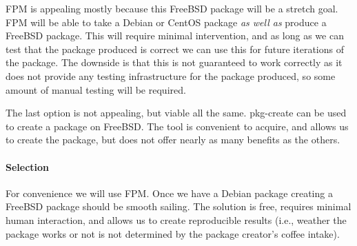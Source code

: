 FPM is appealing mostly because this FreeBSD package will be a stretch goal.
FPM will be able to take a Debian or CentOS package \textit{as well as} produce a FreeBSD package.
This will require minimal intervention, and as long as we can test that the package produced is correct we can use this for future iterations of the package.
The downside is that this is not guaranteed to work correctly as it does not provide any testing infrastructure for the package produced, so some amount of manual testing will be required.

The last option is not appealing, but viable all the same.
pkg-create can be used to create a package on FreeBSD.
The tool is convenient to acquire, and allows us to create the package, but does not offer nearly as many benefits as the others.

\paragraph{Selection}

For convenience we will use FPM.
Once we have a Debian package creating a FreeBSD package should be smooth sailing.
The solution is free, requires minimal human interaction, and allows us to create reproducible results (i.e., weather the package works or not is not determined by the package creator's coffee intake).
